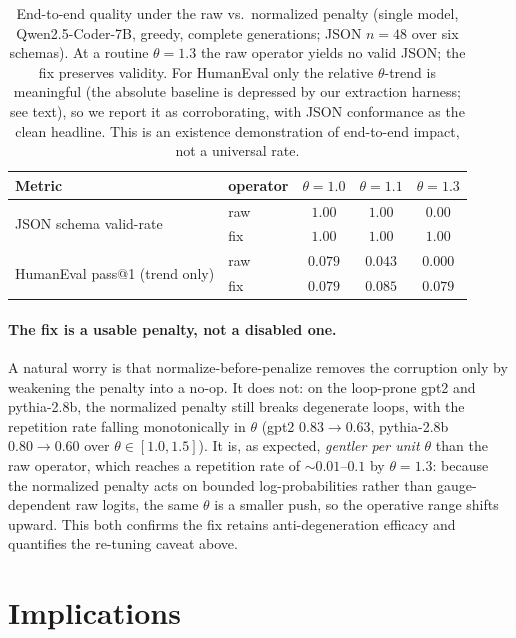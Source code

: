 \documentclass[11pt]{article}
\makeatletter
\newcommand{\thp}{\theta}
\newcommand{\passk}[1]{pass@#1}
\makeatother
\begin{document}
\begin{table}[t]
\centering
\caption{End-to-end quality under the raw vs.\ normalized penalty (single model,
Qwen2.5-Coder-7B, greedy, complete generations; JSON $n=48$ over six schemas). At a routine
$\thp=1.3$ the raw operator yields no valid JSON; the fix preserves validity. For HumanEval
only the relative $\thp$-trend is meaningful (the absolute baseline is depressed by our
extraction harness; see text), so we report it as corroborating, with JSON conformance as the
clean headline. This is an existence demonstration of end-to-end impact, not a universal rate.}
\label{tab:downstream}
\begin{tabular}{llccc}
\toprule
Metric & operator & $\thp{=}1.0$ & $\thp{=}1.1$ & $\thp{=}1.3$ \\
\midrule
\multirow{2}{*}{JSON schema valid-rate}
 & raw & $1.00$ & $1.00$ & $0.00$ \\
 & fix & $1.00$ & $1.00$ & $1.00$ \\
\midrule
\multirow{2}{*}{HumanEval \passk{1} (trend only)}
 & raw & $0.079$ & $0.043$ & $0.000$ \\
 & fix & $0.079$ & $0.085$ & $0.079$ \\
\bottomrule
\end{tabular}
\end{table}

\paragraph{The fix is a usable penalty, not a disabled one.} A natural worry is that
normalize-before-penalize removes the corruption only by weakening the penalty into a no-op.
It does not: on the loop-prone gpt2 and pythia-2.8b, the normalized penalty still breaks
degenerate loops, with the repetition rate falling monotonically in $\thp$ (gpt2
$0.83\to0.63$, pythia-2.8b $0.80\to0.60$ over $\thp\in[1.0,1.5]$). It is, as expected,
\emph{gentler per unit $\thp$} than the raw operator, which reaches a repetition rate of
${\sim}0.01$--$0.1$ by $\thp=1.3$: because the normalized penalty acts on bounded
log-probabilities rather than gauge-dependent raw logits, the same $\thp$ is a smaller push,
so the operative range shifts upward. This both confirms the fix retains anti-degeneration
efficacy and quantifies the re-tuning caveat above.

\section{Implications}
\label{sec:implications}
\end{document}
